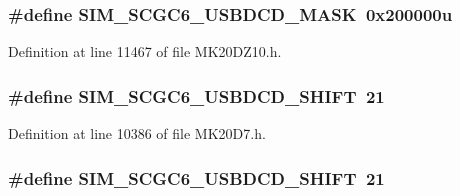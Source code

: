 \subsubsection[{\texorpdfstring{S\+I\+M\+\_\+\+S\+C\+G\+C6\+\_\+\+U\+S\+B\+D\+C\+D\+\_\+\+M\+A\+SK}{SIM_SCGC6_USBDCD_MASK}}]{\setlength{\rightskip}{0pt plus 5cm}\#define S\+I\+M\+\_\+\+S\+C\+G\+C6\+\_\+\+U\+S\+B\+D\+C\+D\+\_\+\+M\+A\+SK~0x200000u}\hypertarget{group___s_i_m___register___masks_gaffd5a351cb6080fec607562adabf3d21}{}\label{group___s_i_m___register___masks_gaffd5a351cb6080fec607562adabf3d21}


Definition at line 11467 of file M\+K20\+D\+Z10.\+h.

\subsubsection[{\texorpdfstring{S\+I\+M\+\_\+\+S\+C\+G\+C6\+\_\+\+U\+S\+B\+D\+C\+D\+\_\+\+S\+H\+I\+FT}{SIM_SCGC6_USBDCD_SHIFT}}]{\setlength{\rightskip}{0pt plus 5cm}\#define S\+I\+M\+\_\+\+S\+C\+G\+C6\+\_\+\+U\+S\+B\+D\+C\+D\+\_\+\+S\+H\+I\+FT~21}\hypertarget{group___s_i_m___register___masks_gae588068f46ee21f080b0a2af46a324c5}{}\label{group___s_i_m___register___masks_gae588068f46ee21f080b0a2af46a324c5}


Definition at line 10386 of file M\+K20\+D7.\+h.

\subsubsection[{\texorpdfstring{S\+I\+M\+\_\+\+S\+C\+G\+C6\+\_\+\+U\+S\+B\+D\+C\+D\+\_\+\+S\+H\+I\+FT}{SIM_SCGC6_USBDCD_SHIFT}}]{\setlength{\rightskip}{0pt plus 5cm}\#define S\+I\+M\+\_\+\+S\+C\+G\+C6\+\_\+\+U\+S\+B\+D\+C\+D\+\_\+\+S\+H\+I\+FT~21}\hypertarget{group___s_i_m___register___masks_gae588068f46ee21f080b0a2af46a324c5}{}\label{group___s_i_m___register___masks_gae588068f46ee21f080b0a2af46a324c5}



